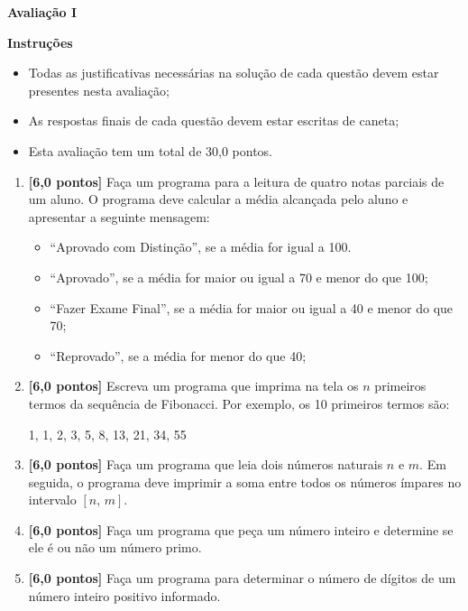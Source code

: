 \documentclass[12pt,a4paper]{article}
\begin{document}
\begin{center}
 \textbf{Avaliação I}
\end{center}

\textbf{Instruções}
\begin{itemize}
 \item Todas as justificativas necessárias na solução de cada questão devem 
 estar presentes nesta avaliação;
 \item As respostas finais de cada questão devem estar escritas de caneta;
 \item Esta avaliação tem um total de 30,0 pontos.
\end{itemize}

\begin{enumerate}
  \item \textbf{[6,0 pontos]} Faça um programa para a leitura de quatro notas parciais de um aluno.
  O programa deve calcular a média alcançada pelo aluno e apresentar a seguinte mensagem:
    \begin{itemize}
      \item ``Aprovado com Distinção'', se a média for igual a 100.
      \item ``Aprovado'', se a média for maior ou igual a 70 e menor do que 100;
      \item ``Fazer Exame Final'', se a média for maior ou igual a 40 e menor do que 70;
      \item ``Reprovado'', se a média for menor do que 40;
    \end{itemize}
  
  \item \textbf{[6,0 pontos]} Escreva um programa que imprima na tela os $n$ primeiros termos
  da sequência de Fibonacci. Por exemplo, os 10 primeiros termos são:
  
  \begin{center}
    1, 1, 2, 3, 5, 8, 13, 21, 34, 55
  \end{center}
  
  \item \textbf{[6,0 pontos]} Faça um programa que leia dois números naturais $n$ e $m$.
  Em seguida, o programa deve imprimir a soma entre todos os números ímpares no intervalo
  $[n,\, m]$.

  \item \textbf{[6,0 pontos]} Faça um programa que peça um número inteiro e determine se
  ele é ou não um número primo.

  \item \textbf{[6,0 pontos]} Faça um programa para determinar o número de dígitos
  de um número inteiro positivo informado.

\end{enumerate}
\end{document}
